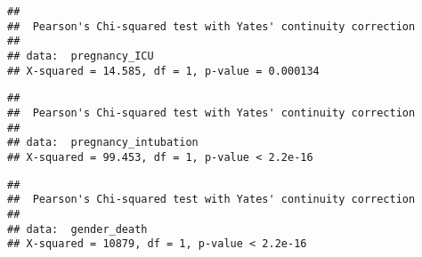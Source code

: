 \documentclass[
]{article}
\newenvironment{Shaded}{\begin{snugshade}}{\end{snugshade}}
\newcommand{\CommentTok}[1]{\textcolor[rgb]{0.56,0.35,0.01}{\textit{#1}}}
\newcommand{\FunctionTok}[1]{\textcolor[rgb]{0.00,0.00,0.00}{#1}}
\newcommand{\NormalTok}[1]{#1}
\newcommand{\OtherTok}[1]{\textcolor[rgb]{0.56,0.35,0.01}{#1}}
\newcommand{\SpecialCharTok}[1]{\textcolor[rgb]{0.00,0.00,0.00}{#1}}
\begin{document}
\begin{Shaded}
\end{Shaded}

\begin{verbatim}
## 
##  Pearson's Chi-squared test with Yates' continuity correction
## 
## data:  pregnancy_ICU
## X-squared = 14.585, df = 1, p-value = 0.000134
\end{verbatim}

\begin{Shaded}
\end{Shaded}

\begin{verbatim}
## 
##  Pearson's Chi-squared test with Yates' continuity correction
## 
## data:  pregnancy_intubation
## X-squared = 99.453, df = 1, p-value < 2.2e-16
\end{verbatim}

\begin{Shaded}
\end{Shaded}

\begin{verbatim}
## 
##  Pearson's Chi-squared test with Yates' continuity correction
## 
## data:  gender_death
## X-squared = 10879, df = 1, p-value < 2.2e-16
\end{verbatim}
\end{document}
